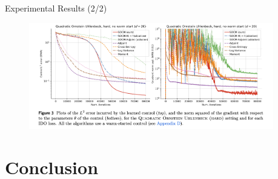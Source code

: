 \documentclass[aspectratio=169,xcolor=dvipsnames]{beamer}
\begin{document}
\begin{frame}{Experimental Results (2/2)}
    \begin{figure}
        \centering
        \includegraphics[width=0.95\textwidth]{figures/plots_2.png}
    \end{figure}
\end{frame}


\section{Conclusion}
\end{document}
